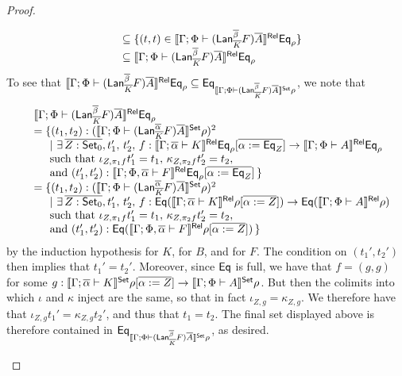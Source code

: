 \documentclass[acmsmall,review,anonymous]{acmart}
\theoremstyle{definition}
\begin{document}
\begin{proof}
\begin{itemize}
\[\begin{array}{ll}
&\subseteq \{ (t,t) \in \llbracket{\Gamma;\Phi \vdash
  (\mathsf{Lan}_{\overline{K}}^{\overline{\beta}} F)\overline{A}}\rrbracket^{\mathsf{Rel}}\mathsf{Eq}_\rho\}\\
&\subseteq \llbracket{\Gamma;\Phi \vdash (\mathsf{Lan}_{\overline{K}}^{\overline{\beta}}
  F)\overline{A}}\rrbracket^{\mathsf{Rel}}\mathsf{Eq}_\rho\\ 
\end{array}\]
To see that $\llbracket{\Gamma; \Phi \vdash (\mathsf{Lan}_{\overline{K}}^{\overline{\beta}}
  F)\overline{A}}\rrbracket^{\mathsf{Rel}}\mathsf{Eq}_\rho \subseteq \mathsf{Eq}_{\llbracket{\Gamma; \Phi \vdash
    (\mathsf{Lan}_{\overline{K}}^{\overline{\beta}} F)\overline{A}}\rrbracket^{\mathsf{Set}}\rho}$, we note that
\[\begin{array}{ll}
&\llbracket{\Gamma;\Phi \vdash (\mathsf{Lan}_{\overline{K}}^{\overline{\beta}}
  F)\overline{A}}\rrbracket^{\mathsf{Rel}}\mathsf{Eq}_\rho\\
&= \{ (t_1, t_2) : (\llbracket{\Gamma;\Phi \vdash
    (\mathsf{Lan}^{\overline{\alpha}}_{\overline{K}} F)\overline{A}}\rrbracket^{\mathsf{Set}}\rho)^2\\
  &\hspace{0.2in}|~\exists\, \overline{Z : {\mathsf{Set}}_0}, t_1',\, t_2',\,
 f : \llbracket{\Gamma; \overline{\alpha} \vdash K}\rrbracket^{\mathsf{Rel}}\mathsf{Eq}_\rho[\overline{\alpha := \mathsf{Eq}_Z}] \to
  \llbracket{\Gamma; \Phi \vdash A}\rrbracket^{\mathsf{Rel}}\mathsf{Eq}_\rho\\
  &\hspace{0.2in}\mbox{such that } \iota_{Z,\pi_1 f}t_1' = t_1,\,
  \kappa_{Z,\pi_2 f}t_2' = t_2,\\
  &  \hspace*{0.2in}\mbox{and } (t_1',t_2') :
  \llbracket{\Gamma; \Phi, \overline{\alpha} \vdash F}\rrbracket^{\mathsf{Rel}}\mathsf{Eq}_\rho[\overline{\alpha :=
      \mathsf{Eq}_Z}]\,\}\\
&= \{ (t_1, t_2) : (\llbracket{\Gamma;\Phi \vdash
    (\mathsf{Lan}^{\overline{\alpha}}_{\overline{K}} F)\overline{A}}\rrbracket^{\mathsf{Set}}\rho)^2\\
  &\hspace{0.2in}|~\exists\, \overline{Z : {\mathsf{Set}}_0}, t_1',\, t_2',\,
 f : \mathsf{Eq} (\llbracket{\Gamma; \overline{\alpha} \vdash K}\rrbracket^{\mathsf{Rel}}\rho[\overline{\alpha := Z}]) \to
  \mathsf{Eq} (\llbracket{\Gamma; \Phi \vdash A}\rrbracket^{\mathsf{Rel}}\rho)\\
  &\hspace{0.2in}\mbox{such that } \iota_{Z,\pi_1 f}t_1' = t_1,\,
  \kappa_{Z,\pi_2 f}t_2' = t_2,\\
  &  \hspace*{0.2in}\mbox{and } (t_1',t_2') :
  \mathsf{Eq} (\llbracket{\Gamma; \Phi, \overline{\alpha} \vdash F}\rrbracket^{\mathsf{Rel}}\rho[\overline{\alpha := Z}])\,\}
\end{array}\]
by the induction hypothesis for $K$, for $B$, and for $F$. The
condition on $(t_1', t_2')$ then implies that $t_1'=t_2'$.  Moreover,
since $\mathsf{Eq}$ is full, we have that $f = (g,g)$ for some $g :
\llbracket{\Gamma; \overline{\alpha} \vdash K}\rrbracket^{\mathsf{Set}}\rho[\overline{\alpha := Z}] \to
\llbracket{\Gamma; \Phi \vdash A}\rrbracket^{\mathsf{Set}}\rho$. But then the colimits into which
$\iota$ and $\kappa$ inject are the same, so that in fact $\iota_{Z,g}
= \kappa_{Z,g}$. We therefore have that $\iota_{Z,g} t_1' =
\kappa_{Z,g} t_2'$, and thus that $t_1 = t_2$. The final set displayed
above is therefore contained in $ \mathsf{Eq}_{\llbracket{\Gamma; \Phi \vdash
    (\mathsf{Lan}_{\overline{K}}^{\overline{\beta}} F)\overline{A}}\rrbracket^{\mathsf{Set}}\rho}$, as desired.

\end{itemize}
\end{proof}
\end{document}
